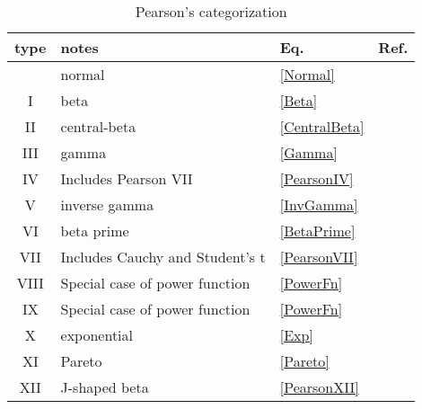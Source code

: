 \begin{table}
\begin{center}
\caption{Pearson's categorization}
\label{PearsonTypesTable}
\begin{tabular}{clll}
\\
type & notes & Eq. & Ref.\\
\hline
 & normal & \eqref{Normal} & \cite{Pearson1895}  \\
I  & beta & \eqref{Beta} & \cite{Pearson1895}  \\
II &  central-beta & \eqref{CentralBeta} & \cite{Pearson1895}  \\
III  &   gamma & \eqref{Gamma}& \cite{Pearson1893}  \\
IV  & Includes Pearson VII & \eqref{PearsonIV}& \cite{Pearson1895}  \\
V   &  inverse gamma & \eqref{InvGamma}& \cite{Pearson1901}  \\
VI   & beta prime &  \eqref{BetaPrime} & \cite{Pearson1901}  \\
VII   & Includes Cauchy and Student's t  &\eqref{PearsonVII} & \cite{Pearson1916}  \\ 
VIII   & Special case of power function & \eqref{PowerFn} & \cite{Pearson1916}  \\
IX  & Special case of power function & \eqref{PowerFn} & \cite{Pearson1916}  \\
X   & exponential & \eqref{Exp} & \cite{Pearson1916}  \\
XI   & Pareto & \eqref{Pareto} & \cite{Pearson1916}  \\
XII   & J-shaped beta  &\eqref{PearsonXII} & \cite{Pearson1916}  \\
\end{tabular}
\end{center}
\end{table}




